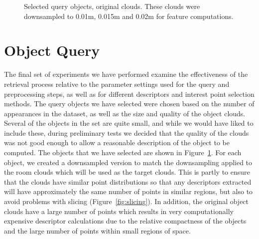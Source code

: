 \documentclass[11pt,a4paper]{kth-mag}
\begin{document}
\begin{figure}[H]
{{\begin{tabular}{c}
      \end{tabular}
    }
    }
    \caption{Selected query objects, original clouds. These clouds were
      downsampled to 0.01m, 0.015m and 0.02m for feature computations.}
  \label{fig:queryobj}
\end{figure}
\section{Object Query}
\label{queryexp}
The final set of experiments we have performed examine the effectiveness of the
retrieval process relative to the parameter settings used for the query and
preprocessing steps, as well as for different descriptors and interest point
selection methods. The query objects we have selected were chosen based on the
number of appearances in the dataset, as well as the size and quality of the
object clouds. Several of the objects in the set are quite small, and while we
would have liked to include these, during preliminary tests we decided that the
quality of the clouds was not good enough to allow a reasonable description of
the object to be computed. The objects that we have selected are shown in
Figure~\ref{fig:queryobj}. For each object, we created a downsampled version to
match the downsampling applied to the room clouds which will be used as the
target clouds. This is partly to ensure that the clouds have similar point
distributions so that any descriptors extracted will have approximately the same
number of points in similar regions, but also to avoid problems with slicing
(Figure~\ref{fig:slicing}). In addition, the original object clouds have a large
number of points which results in very computationally expensive descriptor
calculations due to the relative compactness of the objects and the large number
of points within small regions of space.
\end{document}
